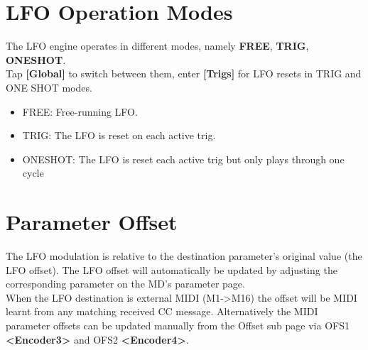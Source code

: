 \section{LFO Operation Modes}

The LFO engine operates in different modes, namely \textbf{FREE}, \textbf{TRIG}, \textbf{ONESHOT}.\\Tap \textbf{[Global]} to switch between them, enter \textbf{[Trigs]} for LFO resets in TRIG and ONE SHOT modes.
\begin{itemize}
    \item FREE: Free-running LFO.
    \item TRIG: The LFO is reset on each active trig.
    \item ONESHOT: The LFO is reset each active trig but only plays through one cycle
\end{itemize}
\section{Parameter Offset}
The LFO modulation is relative to the destination parameter's original value (the LFO offset). The LFO offset will automatically be updated by adjusting the corresponding parameter on the MD's parameter page.\\

When the LFO destination is external MIDI (M1->M16) the offset will be MIDI learnt from any matching received CC message. Alternatively the MIDI parameter offsets can be updated manually from the Offset sub page via OFS1 {\textbf{<Encoder3>}} and OFS2 {\textbf{<Encoder4>}}.